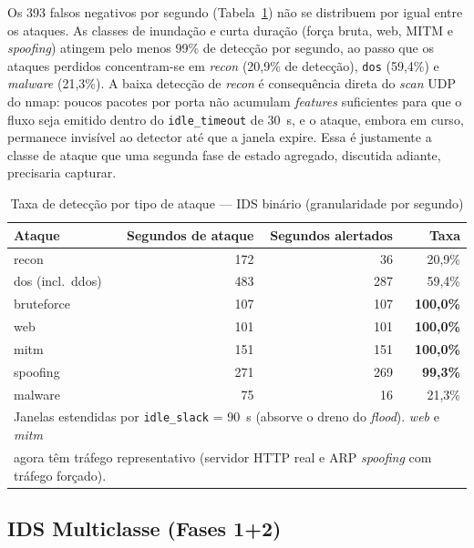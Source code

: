 \documentclass[12pt]{article}
\begin{document}
Os 393 falsos negativos por segundo (Tabela~\ref{tab:detection_rate}) não se
distribuem por igual entre os ataques. As classes de inundação e curta duração
(força bruta, web, MITM e \textit{spoofing}) atingem pelo menos 99\% de detecção
por segundo, ao passo que os ataques perdidos concentram-se em \textit{recon}
(20,9\% de detecção), \texttt{dos} (59,4\%) e \textit{malware} (21,3\%). A baixa
detecção de \textit{recon} é consequência direta do \textit{scan} UDP do nmap:
poucos pacotes por porta não acumulam \textit{features} suficientes para que o
fluxo seja emitido dentro do \texttt{idle\_timeout} de 30~s, e o ataque, embora
em curso, permanece invisível ao detector até que a janela expire. Essa é
justamente a classe de ataque que uma segunda fase de estado agregado, discutida
adiante, precisaria capturar.

\begin{table}[ht]
\centering
\caption{Taxa de detecção por tipo de ataque — IDS binário (granularidade por segundo)}
\label{tab:detection_rate}
\begin{tabular}{@{}lrrr@{}}
\toprule
\textbf{Ataque} & \textbf{Segundos de ataque} & \textbf{Segundos alertados} & \textbf{Taxa} \\ \midrule
recon             &  172 &  36 & 20,9\% \\
dos (incl.\ ddos) &  483 & 287 & 59,4\% \\
bruteforce        &  107 & 107 & \textbf{100,0\%} \\
web               &  101 & 101 & \textbf{100,0\%} \\
mitm              &  151 & 151 & \textbf{100,0\%} \\
spoofing          &  271 & 269 & \textbf{99,3\%} \\
malware           &   75 &  16 & 21,3\% \\ \bottomrule
\multicolumn{4}{l}{\small Janelas estendidas por \texttt{idle\_slack} = 90~s
                   (absorve o dreno do \textit{flood}). \textit{web} e \textit{mitm}} \\
\multicolumn{4}{l}{\small agora têm tráfego representativo (servidor HTTP real e
                   ARP \textit{spoofing} com tráfego forçado).}
\end{tabular}
\end{table}

\subsection{IDS Multiclasse (Fases 1+2)}
\label{subsec:res_multi}
\end{document}
